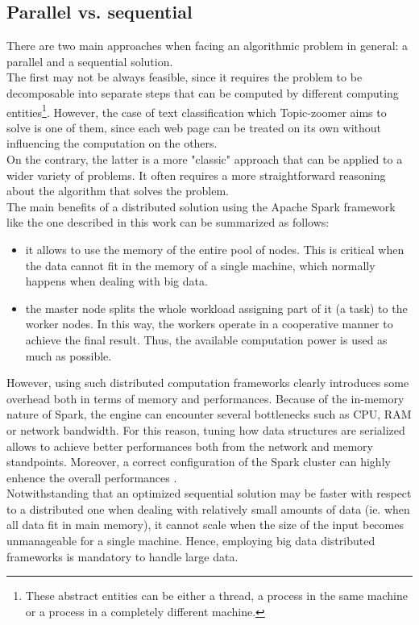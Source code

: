 \documentclass{sig-alternate-05-2015}
\begin{document}
\subsection{Parallel vs. sequential}
There are two main approaches when facing an algorithmic problem in general: a parallel and a sequential solution.\\
The first may not be always feasible, since it requires the problem to be decomposable into separate steps that can be computed by different computing entities\footnote{These abstract entities can be either a thread, a process in the same machine or a process in a completely different machine.}. However, the case of text classification which Topic-zoomer aims to solve is one of them, since each web page can be treated on its own without influencing the computation on the others.\\
On the contrary, the latter is a more "classic" approach that can be applied to a wider variety of problems. It often requires a more straightforward reasoning about the algorithm that solves the problem.\\
The main benefits of a distributed solution using the Apache Spark framework like the one described in this work can be summarized as follows:
\begin{itemize}
    \item it allows to use the memory of the entire pool of nodes. This is critical when the data cannot fit in the memory of a single machine, which normally happens when dealing with big data.
    \item the master node splits the whole workload assigning part of it (a task) to the worker nodes. In this way, the workers operate in a cooperative manner to achieve the final result. Thus, the available computation power is used as much as possible.
\end{itemize}
However, using such distributed computation frameworks clearly introduces some overhead both in terms of memory and performances. Because of the in-memory nature of Spark, the engine can encounter several bottlenecks such as CPU, RAM or network bandwidth. For this reason, tuning how data structures are serialized allows to achieve better performances both from the network and memory standpoints. Moreover, a correct configuration of the Spark cluster can highly enhence the overall performances \cite{li2015sparkbench}.\\
Notwithstanding that an optimized sequential solution may be faster with respect to a distributed one when dealing with relatively small amounts of data (ie. when all data fit in main memory), it cannot scale when the size of the input becomes unmanageable for a single machine. Hence, employing big data distributed frameworks is mandatory to handle large data. 
\end{document}
